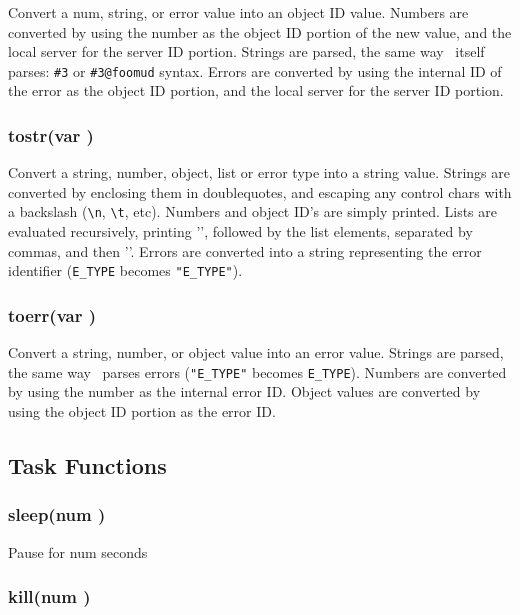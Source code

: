 Convert a num, string, or error value into an object ID value.  Numbers
are converted by using the number as the object ID portion of the new
value, and the local server for the server ID portion.  Strings are parsed,
the same way \COOL\ itself parses:  \verb+#3+ or \verb+#3@foomud+ syntax.  Errors
are converted by using the internal ID of the error as the object ID
portion, and the local server for the server ID portion.

\subsubsection{\func tostr({\funcarg var })}

Convert a string, number, object, list or error type into a string
value.  Strings are converted by enclosing them in doublequotes, and
escaping any control chars with a backslash (\verb+\n+, \verb+\t+, etc).
Numbers and object ID's are simply printed.  Lists are evaluated
recursively, printing '{', followed by the list elements, separated by
commas, and then '}'.  Errors are converted into a string representing
the error identifier (\verb+E_TYPE+ becomes \verb+"E_TYPE"+).

\subsubsection{\func toerr({\funcarg var })}

Convert a string, number, or object value into an error value.
Strings are parsed, the same way \COOLMUD\ parses errors (\verb+"E_TYPE"+
becomes \verb+E_TYPE+).  Numbers are converted by using the number as
the internal error ID.  Object values are converted by using the
object ID portion as the error ID.

\subsection{Task Functions}

\subsubsection{\func sleep({\funcarg num })}

Pause for {\funcarg num } seconds

\subsubsection{\func kill({\funcarg num })}

